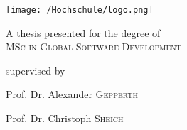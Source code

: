 \begin{titlepage}
	\centering
	\texttt{[image: /Hochschule/logo.png]}\par\vspace{1cm}
	{A thesis presented for the degree of\\
       \scshape MSc in Global Software Development\par}
	\vspace{1.5cm}
	{\huge\bfseries \ftitle{} \par}
	\vspace{2cm}
	{\Large\itshape \fauthor{} \par}
	\vfill
	supervised by\par
	Prof. Dr. Alexander \textsc{Gepperth}
	 \par
	Prof. Dr. Christoph \textsc{Sheich}

	\vfill

	{\large \fdate{} \par}
\end{titlepage}